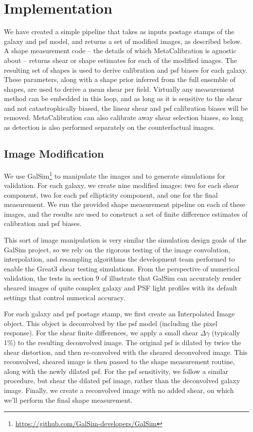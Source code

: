 \documentclass[iop]{emulateapj}
\begin{document}
\section{Implementation}
We have created a simple pipeline that takes as inputs postage stamps
of the galaxy and psf model, and returns a set of modified images, as
described below. A shape measurement code -- the details of which
MetaCalibration is agnostic about -- returns shear or shape estimates
for each of the modified images. The resulting set of shapes is used
to derive calibration and psf biases for each galaxy. These
parameters, along with a shape prior inferred from the full ensemble
of shapes, are used to derive a mean shear per field. Virtually any
measurement method can be embedded in this loop, and as long as it is
sensitive to the shear and not catastrophically biased, the linear
shear and psf calibration biases will be removed. MetaCalibration can
also calibrate away shear selection biases, so long as detection is
also performed separately on the counterfactual images.

\subsection{Image Modification}
We use
GalSim\footnote{\url{https://github.com/GalSim-developers/GalSim}}
\citep{2015A&C....10..121R} to manipulate the images and to generate
simulations for validation. For each galaxy, we create nine modified
images: two for each shear component, two for each psf ellipticity
component, and one for the final measurement. We run the provided
shape measurement pipeline on each of these images, and the results
are used to construct a set of finite difference estimates of
calibration and psf biases.

This sort of image manipulation is very similar the simulation design
goals of the GalSim project, so we rely on the rigorous testing of the
image convolution, interpolation, and resampling algorithms the
development team performed to enable the Great3 shear testing
simulations.  From the perspective of numerical validation, the tests
in section 9 of \cite{2015A&C....10..121R} illustrate that GalSim can
accurately render sheared images of quite complex galaxy and PSF light
profiles with its default settings that control numerical accuracy.

For each galaxy and psf postage stamp, we first create an Interpolated
Image object. This object is deconvolved by the psf model (including
the pixel response). For the shear finite differences, we apply a
small shear $\Delta\gamma$ (typically 1\%) to the resulting
deconvolved image. The original psf is dilated by twice the shear
distortion, and then re-convolved with the sheared deconvolved
image. This reconvolved, sheared image is then passed to the shape
measurement routine, along with the newly dilated psf. For the psf
sensitivity, we follow a similar procedure, but shear the dilated psf
image, rather than the deconvolved galaxy image. Finally, we create a
reconvolved image with no added shear, on which we'll perform the
final shape measurement.
\end{document}
